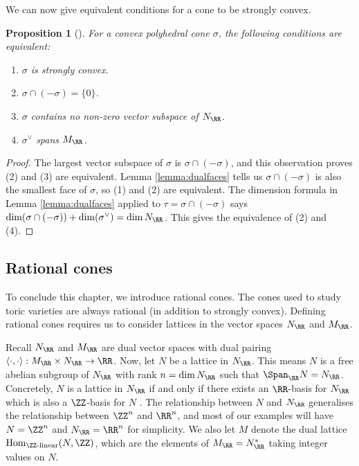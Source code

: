 \documentclass[12pt]{amsart}
\theoremstyle{plain}
\newtheorem{proposition}[theorem]{Proposition}
\theoremstyle{definition}
\begin{document}
We can now give equivalent conditions for a cone to be strongly convex.

\begin{proposition}[{\cite[\S 1.2, Proposition 3]{Fulton93}}]\label{stronglyconvexprop}
For a convex polyhedral cone $\sigma$, the following conditions are equivalent:
\begin{enumerate}
\item $\sigma$ is strongly convex.
\item $\sigma \cap (-\sigma) = \{0\}$.
\item $\sigma$ contains no non-zero vector subspace of $N_\RR$.
\item $\sigma^\vee$ spans $M_\RR$.
\end{enumerate}
\end{proposition}
\begin{proof}
The largest vector subspace of $\sigma$ is $\sigma \cap (-\sigma)$, and this observation proves (2) and (3) are equivalent.
Lemma \ref{lemma:dualfaces} tells us $\sigma \cap(-\sigma)$ is also the smallest face of $\sigma$, so (1) and (2) are equivalent.
The dimension formula in Lemma \ref{lemma:dualfaces} applied to $\tau = \sigma \cap (-\sigma)$ says $\dim(\sigma \cap (-\sigma)) + \dim(\sigma^\vee) = \dim N_\RR$.
This gives the equivalence of (2) and (4).
\end{proof}





\subsection{Rational cones}\label{section:rationalcones}
To conclude this chapter, we introduce rational cones.
The cones used to study toric varieties are always rational (in addition to strongly convex).
Defining rational cones requires us to consider lattices in the vector spaces $N_\RR$ and $M_\RR$.

Recall $N_\RR$ and $M_\RR$ are dual vector spaces with dual pairing $\langle \cdot , \cdot \rangle : M_\RR \times N_\RR \to \RR$.
Now, let $N$ be a lattice in $N_\RR$.
This means $N$ is a free abelian subgroup of $N_\RR$ with rank $n = \dim N_\RR$ such that $\Span_\RR N = N_\RR$.
Concretely, $N$ is a lattice in $N_\RR$ if and only if there exists an $\RR$-basis for $N_\RR$ which is also a $\ZZ$-basis for $N$ \cite[\S 2.2]{Serre73}.
The relationship between $N$ and $N_\RR$ generalises the relationship between $\ZZ^n$ and $\RR^n$, and most of our examples will have $N = \ZZ^n$ and $N_\RR = \RR^n$ for simplicity.
We also let $M$ denote the dual lattice $\mathrm{Hom}_{\ZZ\text{-linear}}(N, \ZZ)$, which are the elements of $M_\RR = N_\RR^*$ taking integer values on $N$.
\end{document}
